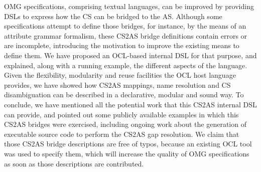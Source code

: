 \documentclass{llncs}
\begin{document}
OMG specifications, comprising textual languages, can be improved by providing  DSLs to express how the CS can be bridged to the AS. Although some specifications attempt to define those bridges, for instance, by the means of an attribute grammar formalism, these CS2AS bridge definitions contain errors or are incomplete, introducing the motivation to improve the existing means to define them. We have proposed an OCL-based internal DSL for that purpose, and explained, along with a running example, the different aspects of the language. Given the flexibility, modularity and reuse facilities the OCL host language provides, we have showed how CS2AS mappings, name resolution and CS disambiguation can be described in a declarative, modular and sound way. To conclude, we have mentioned all the potential work that this CS2AS internal DSL can provide, and pointed out some publicly available examples in which this CS2AS bridges were exercised, including  ongoing work about the generation of executable source code to perform the CS2AS gap resolution. We claim that those CS2AS bridge descriptions are free of typos, because an existing OCL tool was used to specify them, which will increase the quality of OMG specifications as soon as those descriptions are contributed.



\end{document}
